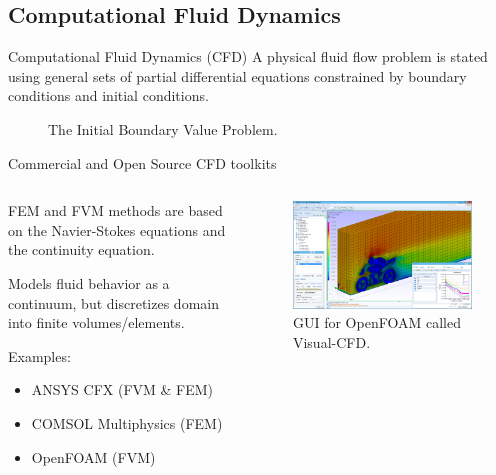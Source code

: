 \documentclass{beamer}
\begin{document}
\subsection{Computational Fluid Dynamics}
\begin{frame}{Computational Fluid Dynamics (CFD)}
A physical fluid flow problem is stated using general sets of partial differential equations constrained by boundary conditions and initial conditions.
\begin{figure}[H]
\centering
\begin{tiny}
\def\svgwidth{1.0\linewidth}

\end{tiny}
\caption{The Initial Boundary Value Problem.}
\label{fig:ibvp}
\end{figure}
\end{frame}

\begin{frame}{Commercial and Open Source CFD toolkits}
\begin{columns}[T] %
\begin{column}{.6\textwidth}
FEM and FVM methods are based on the Navier-Stokes equations and the continuity equation.

Models fluid behavior as a continuum, but discretizes domain into finite volumes/elements.

Examples:

\begin{itemize}
\item ANSYS CFX (FVM \& FEM)
\item COMSOL Multiphysics (FEM)
\item OpenFOAM (FVM)
\end{itemize}
\end{column}%
\begin{column}{.5\textwidth}
\begin{figure}[!htb]
\centering
\begin{tiny} %
\includegraphics[width=1.0\linewidth]{visual-cfd.png}
\end{tiny}
\caption{GUI for OpenFOAM called Visual-CFD.}
\end{figure}
\end{column}%
\end{columns}

\end{frame}
\end{document}
